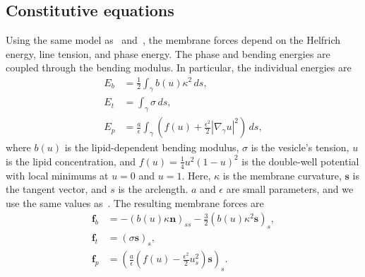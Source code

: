 \documentclass[twoside,twocolumn,9pt]{article}
\newcommand{\ff}{\mathbf{f}}
\newcommand{\nn}{\mathbf{n}}
\renewcommand{\ss}{\mathbf{s}}
\begin{document}
\subsection{Constitutive equations}
Using the same model as~\citet{liu-mar-li-vee-low2017} and~\citet{soh-tse-li-voi-low2010}, the membrane forces depend on the Helfrich energy, line tension, and phase energy. The phase and bending energies are coupled through the bending modulus. In particular, the individual energies are
\begin{align}
    E_b &= \frac{1}{2}\int_{\gamma} b(u) \kappa^2 \, ds, \\
    E_t &= \int_{\gamma} \sigma \, ds, \\
    E_p &= \frac{a}{\epsilon}\int_{\gamma}\left(
    f(u) +\frac{\epsilon^2}{2}|\nabla_\gamma u|^2\right) \, ds,
    \label{eqn:PhaseEnergy}
\end{align}
where $b(u)$ is the lipid-dependent bending modulus, $\sigma$ is the vesicle's tension, $u$ is the lipid concentration, and $f(u) = \frac{1}{4}u^2(1-u)^2$ is the double-well potential with local minimums at $u=0$ and $u=1$. Here, $\kappa$ is the membrane curvature, $\ss$ is the tangent vector, and $s$ is the arclength. $a$ and $\epsilon$ are small parameters, and we use the same values as~\citet{soh-tse-li-voi-low2010}. The resulting membrane forces are
\begin{align}
    \ff_b &= -(b(u)\kappa \nn)_{ss} -\frac{3}{2}\left(b(u) \kappa^2 \ss\right)_s, \\
    \ff_t &= (\sigma \ss)_s, \\
    \ff_p &= \left(\frac{a}{\epsilon}\left(f(u) -
         \frac{\epsilon^2}{2} u_s^2\right) \ss \right)_s.
\end{align}
\end{document}
